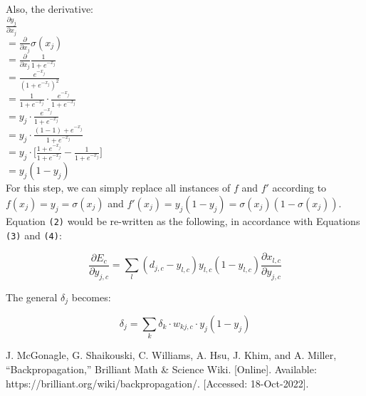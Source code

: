 \documentclass[conference]{IEEEtran}
\newcommand{\dd}[2]{\frac{\partial #1}{\partial #2}} %
\begin{document}
Also, the derivative: \\

$\dd{y_{j}}{x_{j}}$ \\

$= \dd{}{x_{j}} \sigma(x_{j})$ \\

$= \dd{}{x_{j}} \frac{1}{1 + e^{-x_{j}}}$ \\

$= \frac{e^{-x_{j}}}{(1 + e^{-x_{j}})^{2}}$ \\

$= \frac{1}{1 + e^{-x_{j}}} \cdot \frac{e^{-x_{j}}}{1 + e^{-x_{j}}}$ \\

$= y_{j} \cdot \frac{e^{-x_{j}}}{1 + e^{-x_{j}}}$ \\

$= y_{j} \cdot \frac{(1 - 1) + e^{-x_{j}}}{1 + e^{-x_{j}}}$ \\

$= y_{j} \cdot \big[ \frac{1 + e^{-x_{j}}}{1 + e^{-x_{j}}} - \frac{1}{1 + e^{-x_{j}}} \big]$ \\

$= y_{j}(1 - y_{j})$ \\

For this step, we can simply replace all instances of $f$ and $f'$ according to $f(x_{j}) = y_{j} = \sigma(x_{j})$ and $f'(x_{j}) = y_{j}(1 - y_{j}) = \sigma(x_{j})(1 - \sigma(x_{j}))$. Equation \verb+(2)+ would be re-written as the following, in accordance with Equations \verb+(3)+ and \verb+(4)+:

\begin{equation}
\dd{E_{c}}{y_{j, c}} = \sum_{l}(d_{j,c} - y_{l,c})y_{l,c}(1 - y_{l,c})\dd{x_{l,c}}{y_{j,c}}
\end{equation}

The general $\delta_{j}$ becomes:

\begin{equation}
\delta_{j} = \sum_{k}\delta_{k} \cdot w_{kj,c} \cdot y_{j}(1 - y_{j})
\end{equation}


\begin{thebibliography}{00}

 J. McGonagle, G. Shaikouski, C. Williams, A. Hsu, J. Khim, and A. Miller, “Backpropagation,” Brilliant Math \& Science Wiki. [Online]. Available: https://brilliant.org/wiki/backpropagation/. [Accessed: 18-Oct-2022]. 

\end{thebibliography}
\vspace{12pt}
\end{document}
